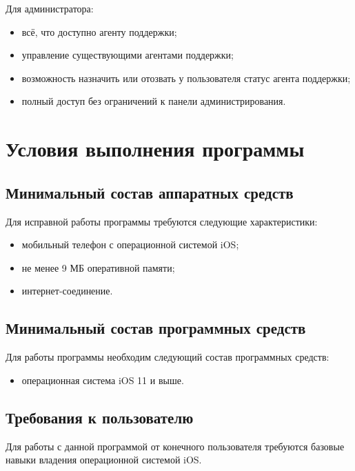 \documentclass{../includes/TechDoc}
\begin{document}
    Для администратора:
    \begin{itemize}[noitemsep]
        \item всё, что доступно агенту поддержки;
        \item управление существующими агентами поддержки;
        \item возможность назначить или отозвать у пользователя статус агента поддержки;
        \item полный доступ без ограничений к панели администрирования.
    \end{itemize}


    \section{Условия выполнения программы}

    \subsection{Минимальный состав аппаратных средств}

    Для исправной работы программы требуются следующие характеристики:
    \begin{itemize}[noitemsep]
        \item мобильный телефон с операционной системой iOS;
        \item не менее 9 МБ оперативной памяти;
        \item интернет-соединение.
    \end{itemize}

    \subsection{Минимальный состав программных средств}

    Для работы программы необходим следующий состав программных средств:
    \begin{itemize}[noitemsep]
        \item операционная система iOS 11 и выше.
    \end{itemize}

    \subsection{Требования к пользователю}

    Для работы с данной программой от конечного пользователя требуются базовые навыки владения
    операционной системой iOS.
\end{document}
